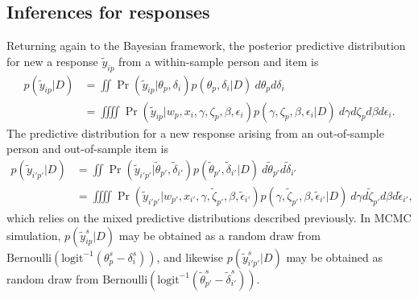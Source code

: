 \documentclass[12pt, letterpaper]{article}
\begin{document}
\subsection{Inferences for responses}

Returning again to the Bayesian framework, the posterior predictive distribution \parencite{rubin1984bayesianly} for new a response $\tilde y_{ip}$ from a within-sample person and item is
\begin{align}
	p(\tilde y_{ip} | D)
	&= \iint
		\Pr (\tilde y_{ip} | \theta_p, \delta_i)
		p(\theta_p, \delta_i | D)
	~d\theta_p d\delta_i \\
	&= \iiiint
		\Pr (\tilde y_{ip} | w_p, x_i, \gamma, \zeta_p, \beta, \epsilon_i)
		p(\gamma, \zeta_p, \beta, \epsilon_i | D)
	~d\gamma d\zeta_p d\beta d\epsilon_i
.\end{align}
The predictive distribution for a new response arising from an out-of-sample person and out-of-sample item is
\begin{align}
	p(\tilde y_{i'p'} | D)
	&= \iint
		\Pr (\tilde y_{i'p'} | \tilde \theta_{p'}, \tilde \delta_{i'})
		p(\tilde \theta_{p'}, \tilde \delta_{i'} | D)
	~d\tilde \theta_{p'} d \tilde \delta_{i'} \\
	&= \iiiint
		\Pr (\tilde y_{i'p'} | w_{p'}, x_{i'}, \gamma, \tilde \zeta_{p'}, 
		                       \beta, \tilde \epsilon_{i'})
		p(\gamma, \tilde \zeta_{p'}, \beta, \tilde \epsilon_{i'} | D)
	~d\gamma d \tilde \zeta_{p'} d \beta d \tilde \epsilon_{i'}
,\end{align}
which relies on the mixed predictive distributions described previously. In MCMC simulation, $p(\tilde y_{ip}^s | D)$ may be obtained as a random draw from
$\mathrm{Bernoulli}(\mathrm{logit}^{-1}(\theta_{p}^s - \delta_{i}^s))$,
and likewise $p(\tilde y_{i'p'}^s | D)$ may be obtained as random draw from
$\mathrm{Bernoulli}(\mathrm{logit}^{-1}(\tilde \theta_{p'}^s - \tilde \delta_{i'}^s))$.
\end{document}
